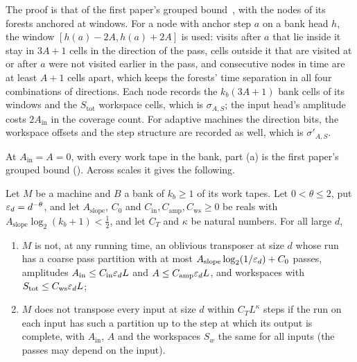\begin{outline}
The proof is that of the first paper's grouped bound~\cite[Theorems~5.8 and~5.12]{FirstPaper2026}, with the nodes of its forests
anchored at windows. For a node with anchor step $a$ on a bank head $h$, the window $[h(a)-2A,h(a)+2A]$ is used: visits after $a$ that lie
inside it stay in $3A+1$ cells in the direction of the pass, cells outside it that are visited at or after $a$ were not visited earlier in
the pass, and
consecutive nodes in time are at least $A+1$ cells apart, which keeps the forests' time separation in all four combinations of
directions. Each node records the $k_b(3A+1)$ bank cells of its windows and the $S_{\mathrm{tot}}$ workspace cells, which is
$\sigma_{A,S}$; the input head's amplitude costs $2A_{\mathrm{in}}$ in the coverage count. For adaptive machines the direction bits, the
workspace offsets and the step structure are recorded as well, which is $\sigma'_{A,S}$.
\end{outline}

At $A_{\mathrm{in}}=A=0$, with every work tape in the bank, part (a) is the first paper's grouped bound ().
Across scales it gives the following.

\begin{corollary}\label{cor:subcritical}
Let $M$ be a machine and $B$ a bank of $k_b\ge1$ of its work tapes. Let $0<\theta\le2$, put $\varepsilon_d=d^{-\theta}$, and let $A_{\mathrm{slope}}$,
$C_0$ and $C_{\mathrm{in}},C_{\mathrm{amp}},C_{\mathrm{ws}}\ge0$ be reals with $A_{\mathrm{slope}}\log_2(k_b+1)<\frac12$, and let $C_T$ and $\kappa$ be
natural numbers. For all large $d$,
\begin{enumerate}[label=(\alph*)]
\item $M$ is not, at any running time, an oblivious transposer at size $d$ whose run has a coarse pass partition with at most
$A_{\mathrm{slope}}\log_2(1/\varepsilon_d)+C_0$ passes, amplitudes $A_{\mathrm{in}}\le C_{\mathrm{in}}\varepsilon_dL$ and $A\le C_{\mathrm{amp}}\varepsilon_dL$, and
workspaces with $S_{\mathrm{tot}}\le C_{\mathrm{ws}}\varepsilon_dL$;
\item $M$ does not transpose every input at size $d$ within $C_TL^\kappa$ steps if the run on each input has such a partition up to the
step at which its output is complete, with $A_{\mathrm{in}}$, $A$ and the workspaces $S_w$ the same for all inputs (the passes may
depend on the input).
\end{enumerate}
\end{corollary}

